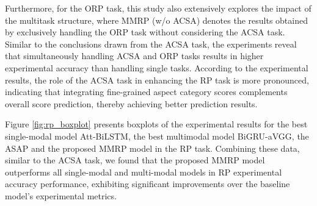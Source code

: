 \documentclass[preprint,12pt]{elsarticle}
\begin{document}
Furthermore, for the ORP task, this study also extensively explores the impact of the multitask structure, where MMRP (w/o ACSA) denotes the results obtained by exclusively handling the ORP task without considering the ACSA task. Similar to the conclusions drawn from the ACSA task, the experiments reveal that simultaneously handling ACSA and ORP tasks results in higher experimental accuracy than handling single tasks. According to the experimental results, the role of the ACSA task in enhancing the RP task is more pronounced, indicating that integrating fine-grained aspect category scores complements overall score prediction, thereby achieving better prediction results. 


Figure \ref{fig:rp_boxplot} presents boxplots of the experimental results for the best single-modal model Att-BiLSTM, the best multimodal model BiGRU-aVGG, the ASAP and the proposed MMRP model in the RP task. Combining these data, similar to the ACSA task, we found that the proposed MMRP model outperforms all single-modal and multi-modal models in RP experimental accuracy performance, exhibiting significant improvements over the baseline model's experimental metrics.



\end{document}

